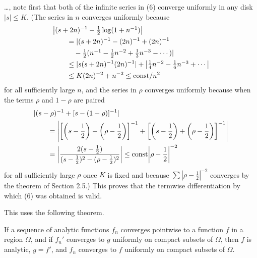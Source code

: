 \documentclass[12pt]{note}
\numberwithin{equation}{chapter}
\begin{document}
\begin{quotebar}
    \dots, note first that both of the infinite series in (6) converge uniformly in
    any disk \( |s| \leq K \). (The series in \( n \) converges uniformly because
    \begin{align*}
         & \abs{(s + 2n)^{-1} - \textstyle\frac{1}{2} \log(1 + n^{-1})}      \\
         & \qquad = |(s + 2n)^{-1} - (2n)^{-1} + (2n)^{-1}                   \\
         & \qquad \quad - \textstyle\frac{1}{2}(n^{-1} - \frac{1}{2}n^{-2} +
        \frac{1}{3}n^{-3} - \cdots )|                                        \\
         & \qquad \leq |s(s + 2n)^{-1}(2n)^{-1}| + \textstyle \abs{
        \frac{1}{4}n^{-2} - \frac{1}{6}n^{-3} + \cdots}                      \\
         & \qquad \leq K(2n)^{-2} + n^{-2} \leq \text{const}/n^2
    \end{align*}
    for all sufficiently large \( n \), and the series in \( \rho \) converges
    uniformly because when the terms \( \rho \) and \( 1 - \rho \) are paired
    \begin{align*}
         & |(s - \rho)^{-1} + [s - (1 - \rho)]^{-1}|                          \\
         & \qquad = \left| \left[\prn{s - \frac{1}{2}} - \prn{\rho -
                \frac{1}{2}}\right]^{-1} + \left[\prn{s - \frac{1}{2}} +
        \prn{\rho - \frac{1}{2}}\right]^{-1} \right|                          \\
         & \qquad = \left\lvert \frac{2(s - \frac{1}{2})}{(s - \frac{1}{2})^2
            - (\rho - \frac{1}{2})^2} \right\rvert
        \leq \text{const} \left\lvert \rho - \frac{1}{2} \right\rvert^{-2}
    \end{align*}
    for all sufficiently large \( \rho \) once \( K \) is fixed and because \( \sum
    |\rho - \frac{1}{2}|^{-2} \) converges by the theorem of Section 2.5.) This
    proves that the termwise differentiation by which (6) was obtained is valid.
\end{quotebar}

This uses the following theorem.
\begin{theorem*}
    If a sequence of analytic functions \( f_n
    \) converges pointwise to a function \( f \) in a region \( \Omega \), and if
    \( f_n' \) converges to \( g \) uniformly on compact subsets of \( \Omega \),
    then \( f \) is analytic, \( g = f' \), and \( f_n \) converges to \( f \)
    uniformly on compact subsets of \( \Omega \).
\end{theorem*}
\end{document}
